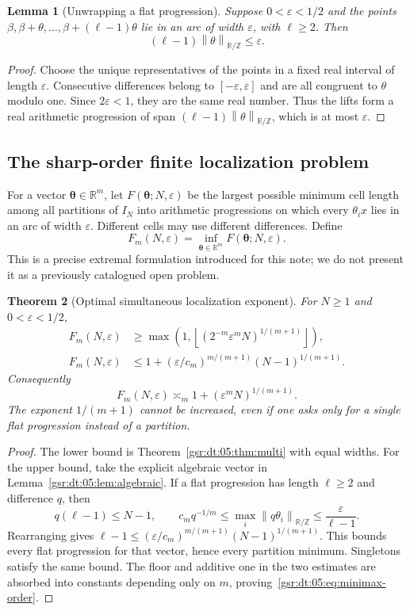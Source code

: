 \documentclass[11pt,letterpaper]{article}
\numberwithin{equation}{section}
\newtheorem{theorem}{Theorem}[section]
\newtheorem{lemma}[theorem]{Lemma}
\theoremstyle{definition}
\theoremstyle{remark}
\newcommand{\R}{\mathbb R}
\newcommand{\Z}{\mathbb Z}
\newcommand{\1}{\mathbf 1}
\newcommand{\cnorm}[1]{\left\|#1\right\|_{\R/\Z}}
\newcommand{\eps}{\varepsilon}
\begin{document}
\begin{lemma}[Unwrapping a flat progression]
\label{gsr:dt:05:lem:unwrap}
Suppose $0<\eps<1/2$ and the points
$\beta,\beta+\theta,\ldots,\beta+(\ell-1)\theta$ lie in an arc of width $\eps$, with $\ell\geq2$. Then
\[
 (\ell-1)\cnorm{\theta}\leq\eps.
\]
\end{lemma}
\begin{proof}
Choose the unique representatives of the points in a fixed real interval of length $\eps$. Consecutive differences belong to $[-\eps,\eps]$ and are all congruent to $\theta$ modulo one. Since $2\eps<1$, they are the same real number. Thus the lifts form a real arithmetic progression of span $(\ell-1)\cnorm{\theta}$, which is at most $\eps$.
\end{proof}

\subsection{The sharp-order finite localization problem}
For a vector $\boldsymbol\theta\in\R^m$, let $F(\boldsymbol\theta;N,\eps)$ be the largest possible minimum cell length among all partitions of $I_N$ into arithmetic progressions on which every $\theta_i x$ lies in an arc of width $\eps$. Different cells may use different differences. Define
\[
 F_m(N,\eps)=\inf_{\boldsymbol\theta\in\R^m}F(\boldsymbol\theta;N,\eps).
\]
This is a precise extremal formulation introduced for this note; we do not present it as a previously catalogued open problem.

\begin{theorem}[Optimal simultaneous localization exponent]
\label{gsr:dt:05:thm:minimax}
For $N\geq1$ and $0<\eps<1/2$,
\begin{align}
 F_m(N,\eps)&\geq
 \max\left(1,\left\lfloor(2^{-m}\eps^mN)^{1/(m+1)}\right\rfloor\right),
 \label{gsr:dt:05:eq:minimax-lower}\\
 F_m(N,\eps)&\leq
 1+(\eps/c_m)^{m/(m+1)}(N-1)^{1/(m+1)}.
 \label{gsr:dt:05:eq:minimax-upper}
\end{align}
Consequently
\begin{equation}
 F_m(N,\eps)\asymp_m 1+(\eps^mN)^{1/(m+1)}.
 \label{gsr:dt:05:eq:minimax-order}
\end{equation}
The exponent $1/(m+1)$ cannot be increased, even if one asks only for a single flat progression instead of a partition.
\end{theorem}
\begin{proof}
The lower bound is Theorem~\ref{gsr:dt:05:thm:multi} with equal widths. For the upper bound, take the explicit algebraic vector in Lemma~\ref{gsr:dt:05:lem:algebraic}. If a flat progression has length $\ell\geq2$ and difference $q$, then
\[
 q(\ell-1)\leq N-1,\qquad
 c_mq^{-1/m}\leq\max_i\cnorm{q\theta_i}\leq\frac\eps{\ell-1}.
\]
Rearranging gives
$\ell-1\leq(\eps/c_m)^{m/(m+1)}(N-1)^{1/(m+1)}$. This bounds every flat progression for that vector, hence every partition minimum. Singletons satisfy the same bound. The floor and additive one in the two estimates are absorbed into constants depending only on $m$, proving~\eqref{gsr:dt:05:eq:minimax-order}.
\end{proof}
\end{document}
